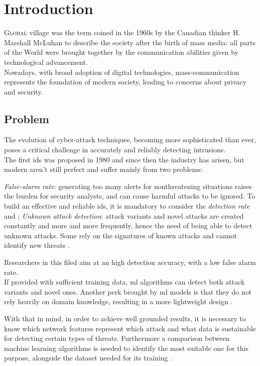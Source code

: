 \chapter{Introduction}
\label{chap:intro}

\lettrine[lines=4, findent=3pt, nindent=0pt]{G}{lobal} village was the term coined in the 1960s by the Canadian thinker H. Marshall McLuhan \cite{mcluhan1962} to describe the society after the birth of mass media: all parts of the World were brought together by the communication abilities given by technological advancement. \\
Nowadays, with broad adoption of digital technologies, mass-communication represents the foundation of modern society, leading to concerns about privacy and security.




\section{Problem}
\label{sec:problem}

The evolution of cyber-attack techniques, becoming more sophisticated than ever, poses a critical challenge in accurately and reliably detecting intrusions.\\ The first \gls{ids} was proposed in 1980 \cite{Andreson1980} and since then the industry has arisen, but modern  aren't still perfect and suffer mainly from two problems:
\begin{itemize}
    \itemAR \textit{False-alarm rate}: generating too many alerts for nonthreatening situations raises the burden for security analysts, and can cause harmful attacks to be ignored. To build an effective and reliable \gls{ids}, it is mandatory to consider the \textit{detection rate} \cite{Axelsson2000} and \cite{Liu2019};
    \itemAR \textit{Unknown attack detection}: attack variants and novel attacks are created constantly and more and more frequently, hence the need of being able to detect unknown attacks. Some  rely on the signatures of known attacks and cannot identify new threats \cite{Hodo2017}.
\end{itemize}
Researchers in this filed aim at an high detection accuracy, with a low false alarm rate. \\
If provided with sufficient training data, \gls{ml} algorithms can detect both attack variants and novel ones. Another perk brought by \gls{ml} models is that they do not rely heavily on domain knowledge, resulting in a more lightweight design \cite{Khraisat2019}. 
\par With that in mind, in order to achieve well grounded results, it is necessary to know which network features represent which attack \cite{Iglesias2015} and what data is sustainable for detecting certain types of threats. Furthermore a comparison between machine learning algorithms is needed to identify the most suitable one for this purpose, alongside the dataset needed for its training \cite{Sharafaldin2019}.


